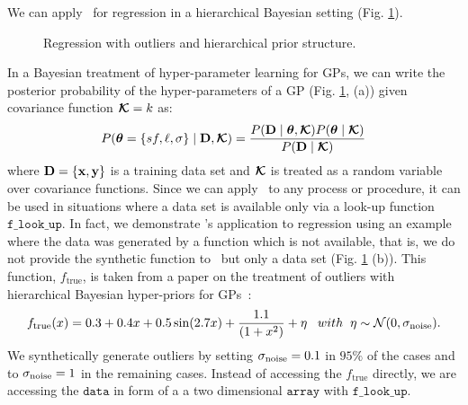 We can apply \gpmem\ for regression in a hierarchical Bayesian setting
(Fig. \ref{fig:neal_tutorial}).  
\begin{figure}

\captionsetup{aboveskip=-7pt}
\caption{\footnotesize Regression with outliers and hierarchical prior
structure.}
\label{fig:neal_tutorial}
\end{figure}
In a Bayesian treatment of  hyper-parameter learning for \ac{GP}s,
we can write the posterior probability of the hyper-parameters of a GP  (Fig.
\ref{fig:neal_tutorial}, (a)) given covariance function $\bm{\mathcal{K}}=k$ as:
\begin{equation}
\label{eq:hyperProbability}
P(\bm{\theta}=\{sf,\ell,\sigma\} \mid \mathbf{D},\bm{\mathcal{K}} ) = \frac{P(\mathbf{D} \mid
\bm{\theta}, \bm{\mathcal{K}})P(\bm{\theta} \mid \bm{\mathcal{K}}) }{P(\mathbf{D} \mid
\bm{\mathcal{K}})}
\end{equation}
where $\mathbf{D} = \{\mathbf{x}, \mathbf{y}\}$ is a training data set and $\bm{\mathcal{K}}$ is treated
as a random variable over covariance functions. Since we can apply
\gpmem\ to any process or procedure, it can be used in situations where a data
set is available only via a look-up function $\texttt{f\_look\_up}$.
In fact, we demonstrate \gpmem's application to regression using an example where
the data was generated by a function which is not available, that is, we do not
provide the synthetic function to \gpmem\ but only a data set (Fig.
\ref{fig:neal_tutorial} (b)).
This function, $f_\text{true}$, is taken from a paper on the
treatment of outliers with hierarchical Bayesian hyper-priors for
\ac{GP}s~\citep{neal1997monte}:
\begin{equation}
f_\text{true}(x) =  0.3 + 0.4 x + 0.5 \sin(2.7x) + \frac{1.1}{(1+ x^2)} + \eta
\;\;\; with\;\;\eta \sim \mathcal{N}(0,\sigma_{\text{noise}}).
\end{equation}
We synthetically generate outliers by setting $\sigma_{\text{noise}} = 0.1$ in $95\%$ of
the cases and to $\sigma_{\text{noise}} = 1$ in the remaining cases. 
Instead of accessing the $f_\text{true}$ directly, we are accessing the $\texttt{data}$ in form of
a a two dimensional $\texttt{array}$ with $\texttt{f\_look\_up}$.

